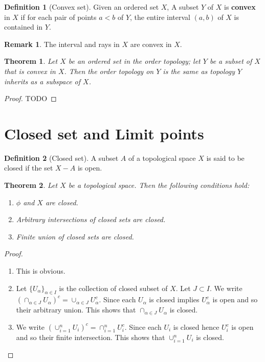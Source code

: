 \documentclass[12pt,reqno]{amsart}
\theoremstyle{plain}
\newtheorem{thm}{Theorem}
\theoremstyle{definition}
\newtheorem{defn}{Definition}
\newtheorem{rem}{Remark}
\begin{document}
\begin{defn}[Convex set]
    Given an ordered set $X$, A subset $Y$ of $X$ is {\bf convex} in $X$ if for each pair of points $a < b$ of $Y$, the entire interval $(a,b)$ of $X$ is contained in $Y$. 
\end{defn}
\begin{rem}
    The interval and rays in $X$ are convex in $X$.    
\end{rem}
\begin{thm}
    Let $X$ be an ordered set in the order topology; let $Y$ be a subset of $X$ that is convex in $X$. Then the order topology on $Y$ is the same as topology $Y$ inherits as a subspace of $X$.
\end{thm}
\begin{proof}
    TODO
\end{proof}
\section{Closed set and Limit points}
\begin{defn}[Closed set]
    A subset $A$ of a topological space $X$ is said to be closed if the set $X - A$ is open.
\end{defn}
\begin{thm}
    Let $X$ be a topological space. Then the following conditions hold:
    \begin{enumerate}
        \item $\phi$ and $X$ are closed.
        \item Arbitrary intersections of closed sets are closed.
        \item Finite union of closed sets are closed.
    \end{enumerate}
\end{thm}
\begin{proof} \noindent
    \begin{enumerate}
        \item This is obvious.
        \item Let $\{U_\alpha\}_{\alpha \in I}$ is the collection of closed subset of $X$. Let $J \subset I$. We write $(\cap_{\alpha \in J}U_\alpha)^c = \cup_{\alpha \in J}U_\alpha^c$. Since each $U_\alpha$ is closed implies $U_\alpha^c$ is open and so their arbitrary union. This shows that $\cap_{\alpha \in J}U_\alpha$ is closed.
        \item We write $(\cup_{i=1}^n U_i)^c = \cap_{i = 1}^n U_i^c$. Since each $U_i$ is closed hence $U_i^c$ is open and so their finite intersection. This shows that $\cup_{i=1}^n U_i$ is closed.
    \end{enumerate}
\end{proof}
\end{document}
